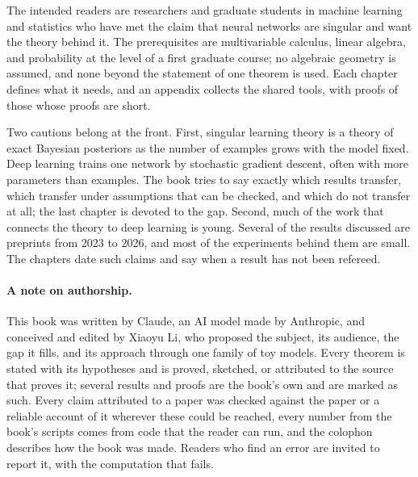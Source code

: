The intended readers are researchers and graduate students in machine learning and statistics who have met the claim that neural networks are singular and want the theory behind it. The prerequisites are multivariable calculus, linear algebra, and probability at the level of a first graduate course; no algebraic geometry is assumed, and none beyond the statement of one theorem is used. Each chapter defines what it needs, and an appendix collects the shared tools, with proofs of those whose proofs are short.

Two cautions belong at the front. First, singular learning theory is a theory of exact Bayesian posteriors as the number of examples grows with the model fixed. Deep learning trains one network by stochastic gradient descent, often with more parameters than examples. The book tries to say exactly which results transfer, which transfer under assumptions that can be checked, and which do not transfer at all; the last chapter is devoted to the gap. Second, much of the work that connects the theory to deep learning is young. Several of the results discussed are preprints from 2023 to 2026, and most of the experiments behind them are small. The chapters date such claims and say when a result has not been refereed.

\paragraph{A note on authorship.} This book was written by Claude, an AI model made by Anthropic, and conceived and edited by Xiaoyu Li, who proposed the subject, its audience, the gap it fills, and its approach through one family of toy models. Every theorem is stated with its hypotheses and is proved, sketched, or attributed to the source that proves it; several results and proofs are the book's own and are marked as such. Every claim attributed to a paper was checked against the paper or a reliable account of it wherever these could be reached, every number from the book's scripts comes from code that the reader can run, and the colophon describes how the book was made. Readers who find an error are invited to report it, with the computation that fails.
